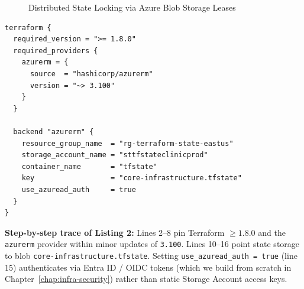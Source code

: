 \begin{figure}[htbp]
\centering
{}
\caption{Distributed State Locking via Azure Blob Storage Leases}
\label{fig:v3-ch04-blob-lease}
\end{figure}

\begin{lstlisting}[language=hcl, caption={Production Azure Remote Backend Using Entra ID Auth}]
terraform {
  required_version = ">= 1.8.0"
  required_providers {
    azurerm = {
      source  = "hashicorp/azurerm"
      version = "~> 3.100"
    }
  }

  backend "azurerm" {
    resource_group_name  = "rg-terraform-state-eastus"
    storage_account_name = "sttfstateclinicprod"
    container_name       = "tfstate"
    key                  = "core-infrastructure.tfstate"
    use_azuread_auth     = true
  }
}
\end{lstlisting}

\textbf{Step-by-step trace of Listing 2:} Lines 2--8 pin Terraform $\ge 1.8.0$ and the \texttt{azurerm} provider within minor updates of \texttt{3.100}. Lines 10--16 point state storage to blob \texttt{core-infrastructure.tfstate}. Setting \texttt{use\_azuread\_auth = true} (line 15) authenticates via Entra ID / OIDC tokens (which we build from scratch in Chapter~\ref{chap:infra-security}) rather than static Storage Account access keys.

